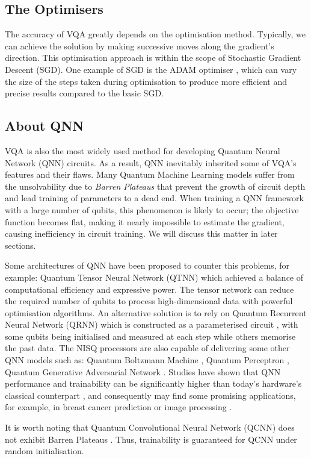 \subsection{The Optimisers}
The accuracy of VQA greatly depends on the optimisation method.
Typically, we can achieve the solution by making successive moves along the gradient's direction.
This optimisation approach is within the scope of Stochastic Gradient Descent (SGD).
One example of SGD is the ADAM optimiser \cite{kingmaAdamMethodStochastic2014}, which can vary the size of the steps taken during optimisation to produce more efficient and precise results compared to the basic SGD.


\subsection{About QNN}
VQA is also the most widely used method for developing Quantum Neural Network (QNN) circuits. 
As a result, QNN inevitably inherited some of VQA's features and their flaws.
Many Quantum Machine Learning models suffer from the unsolvability due to \textit{Barren Plateaus} \cite{zhaoReviewQuantumNeural2021} that prevent the growth of circuit depth and lead training of parameters to a dead end.
When training a QNN framework with a large number of qubits, this phenomenon is likely to occur; the objective function becomes flat, making it nearly impossible to estimate the gradient, \cite{mccleanBarrenPlateausQuantum2018, zhaoAnalyzingBarrenPlateau2021} causing inefficiency in circuit training. 
We will discuss this matter in later sections.

Some architectures of QNN have been proposed to counter this problems, for example: 
Quantum Tensor Neural Network (QTNN) \cite{hugginsQuantumMachineLearning2019} which achieved a balance of computational efficiency and expressive power. 
The tensor network can reduce the required number of qubits to process high-dimensional data with powerful optimisation algorithms.
An alternative solution is to rely on Quantum Recurrent Neural Network (QRNN) which is constructed as a parameterised circuit \cite{takakiLearningTemporalData2021}, with some qubits being initialised and measured at each step while others memorise the past data.
The NISQ processors are also capable of delivering some other QNN models such as: 
Quantum Boltzmann Machine \cite{shinguBoltzmannMachineLearning2021, zoufalVariationalQuantumBoltzmann2021}, 
Quantum Perceptron \cite{kristensenArtificialSpikingQuantum2021}, 
Quantum Generative Adversarial Network \cite{dallaire-demersQuantumGenerativeAdversarial2018, lloydQuantumGenerativeAdversarial2018}. 
Studies have shown that QNN performance and trainability can be significantly higher than today's hardware's classical counterpart \cite{abbasPowerQuantumNeural2021, colesSeekingQuantumAdvantage2021}, and consequently may find some promising applications, for example, in breast cancer prediction \cite{liModelAlgorithmQuantuminspired2014} or image processing \cite{matsuiQubitNeuralNetwork2009}.

It is worth noting that Quantum Convolutional Neural Network (QCNN) does not exhibit Barren Plateaus \cite{pesahAbsenceBarrenPlateaus2021}.
Thus, trainability is guaranteed for QCNN under random initialisation.